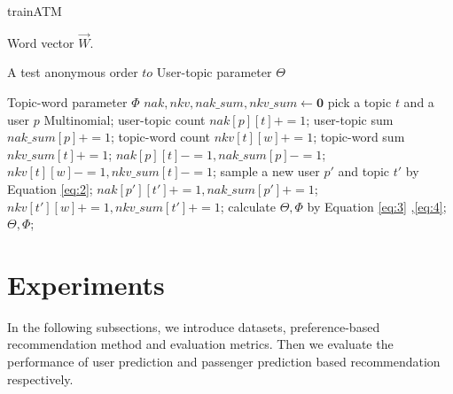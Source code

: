 \documentclass{llncs}
\begin{document}
\begin{algorithm}[htb]
\caption{trainATM}
\begin{algorithmic}[1]
\label{alg:2}
\REQUIRE
Word vector $\overrightarrow{W}$. \par
A test anonymous order $to$
\ENSURE 
User-topic parameter $\Theta$ \par
Topic-word parameter $\Phi$
\STATE $nak , nkv, nak\_sum, nkv\_sum \leftarrow \mathbf{0}$
\STATE pick a topic $t$ and a user $p$ Multinomial;
\STATE user-topic count $nak[p][t] += 1$;
\STATE user-topic sum $nak\_sum[p] += 1$;
\STATE topic-word count $nkv[t][w] += 1$;
\STATE topic-word sum $nkv\_sum[t] += 1$;
\ENDFOR
\ENDFOR
{}
\STATE $nak[p][t] -= 1, nak\_sum[p] -= 1$;
\STATE $nkv[t][w] -= 1, nkv\_sum[t] -= 1$;
\STATE sample a new user $p'$ and topic $t'$ by Equation \ref{eq:2};
\STATE $nak[p'][t'] += 1, nak\_sum[p'] += 1$;
\STATE $nkv[t'][w] += 1, nkv\_sum[t'] += 1$;
\ENDFOR
\ENDFOR
\ENDWHILE
\STATE calculate $\Theta,\Phi$ by Equation \ref{eq:3} ,\ref{eq:4};
\RETURN $\Theta,\Phi$;
\end{algorithmic} 
\end{algorithm}


\section{Experiments}
\label{sec:exp}
In the following subsections, we introduce datasets, preference-based recommendation method and evaluation metrics. Then we evaluate the performance of user prediction and passenger prediction based recommendation respectively.
\end{document}
